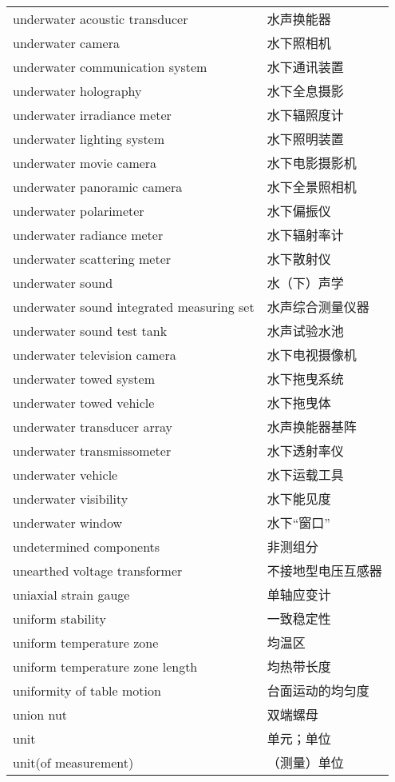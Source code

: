 \documentclass[
]{article}
\begin{document}
\begin{longtable}[]{@{}ll@{}}
underwater acoustic transducer & 水声换能器 \\
underwater camera & 水下照相机 \\
underwater communication system & 水下通讯装置 \\
underwater holography & 水下全息摄影 \\
underwater irradiance meter & 水下辐照度计 \\
underwater lighting system & 水下照明装置 \\
underwater movie camera & 水下电影摄影机 \\
underwater panoramic camera & 水下全景照相机 \\
underwater polarimeter & 水下偏振仪 \\
underwater radiance meter & 水下辐射率计 \\
underwater scattering meter & 水下散射仪 \\
underwater sound & 水（下）声学 \\
underwater sound integrated measuring set & 水声综合测量仪器 \\
underwater sound test tank & 水声试验水池 \\
underwater television camera & 水下电视摄像机 \\
underwater towed system & 水下拖曳系统 \\
underwater towed vehicle & 水下拖曳体 \\
underwater transducer array & 水声换能器基阵 \\
underwater transmissometer & 水下透射率仪 \\
underwater vehicle & 水下运载工具 \\
underwater visibility & 水下能见度 \\
underwater window & 水下``窗口'' \\
undetermined components & 非测组分 \\
unearthed voltage transformer & 不接地型电压互感器 \\
uniaxial strain gauge & 单轴应变计 \\
uniform stability & 一致稳定性 \\
uniform temperature zone & 均温区 \\
uniform temperature zone length & 均热带长度 \\
uniformity of table motion & 台面运动的均匀度 \\
union nut & 双端螺母 \\
unit & 单元；单位 \\
unit(of measurement) & （测量）单位 \\

\end{longtable}
\end{document}
